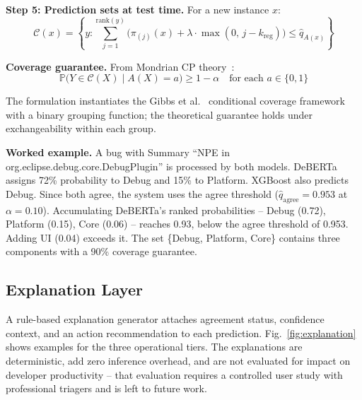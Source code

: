 \documentclass[conference]{IEEEtran}
\newcommand{\calC}{\mathcal{C}}
\newcommand{\PP}{\mathbb{P}}
\begin{document}
\smallskip
\noindent\textbf{Step 5: Prediction sets at test time.}
For a new instance $x$:
\begin{equation}\label{eq:pred-set}
\calC(x) = \left\{y : \sum_{j=1}^{\text{rank}(y)} \!\Big(\pi_{(j)}(x) + \lambda \cdot \max(0,\, j - k_\text{reg})\Big) \leq \hat{q}_{A(x)}\right\}
\end{equation}

\smallskip
\noindent\textbf{Coverage guarantee.}
From Mondrian CP theory~\cite{vovk2005algorithmic}:
\begin{equation}\label{eq:coverage}
\PP\!\big(Y \in \calC(X) \mid A(X) = a\big) \geq 1 - \alpha \quad \text{for each } a \in \{0, 1\}
\end{equation}

The formulation instantiates the Gibbs et al.~\cite{gibbs2025conditional} conditional coverage framework with a binary grouping function; the theoretical guarantee holds under exchangeability within each group.

\smallskip\noindent\textbf{Worked example.} A bug with Summary ``NPE in org.eclipse.debug.core.DebugPlugin'' is processed by both models. DeBERTa assigns 72\% probability to Debug and 15\% to Platform. XGBoost also predicts Debug. Since both agree, the system uses the agree threshold ($\hat{q}_{\text{agree}} = 0.953$ at $\alpha{=}0.10$). Accumulating DeBERTa's ranked probabilities -- Debug (0.72), Platform (0.15), Core (0.06) -- reaches 0.93, below the agree threshold of 0.953. Adding UI (0.04) exceeds it. The set \{Debug, Platform, Core\} contains three components with a 90\% coverage guarantee.

\subsection{Explanation Layer}

A rule-based explanation generator attaches agreement status, confidence context, and an action recommendation to each prediction. Fig.~\ref{fig:explanation} shows examples for the three operational tiers. The explanations are deterministic, add zero inference overhead, and are not evaluated for impact on developer productivity -- that evaluation requires a controlled user study with professional triagers and is left to future work.
\end{document}
